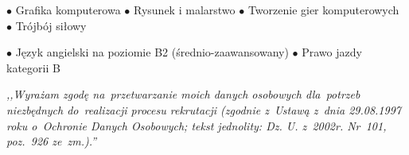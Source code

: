 \documentclass[11pt,a4paper]{article}
\begin{document}

    \bigskip
  
  
    \smallskip
    $\bullet$ Grafika komputerowa
    \hspace{0.34cm}
    $\bullet$ Rysunek i malarstwo
    \hspace{0.34cm}
    $\bullet$ Tworzenie gier komputerowych
    \hspace{0.34cm}
    $\bullet$ Trójbój siłowy
  

    \bigskip
  
  
    \smallskip
    $\bullet$ Język angielski na poziomie B2 (średnio-zaawansowany)
    \hspace{0.34cm}
    $\bullet$ Prawo jazdy kategorii B
  

    \vspace{1cm}
  
    \noindent \textit{,,Wyrażam zgodę na~przetwarzanie moich danych osobowych dla~potrzeb niezbędnych do~realizacji
    procesu rekrutacji (zgodnie z~Ustawą z~dnia 29.08.1997 roku o~Ochronie Danych Osobowych; tekst jednolity: Dz. U.
    z~2002r. Nr~101, poz.~926 ze~zm.).''}
\end{document}
